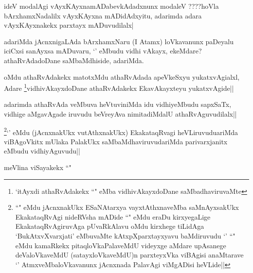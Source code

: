 \begin{artha}
ideV modalAgi vAyxKAyxnamADabevkAdadxnunx modaleV ????hoVla bArxhamxNadalilx vAyxKAyxna mADidAdxyitu, adarimda adara vAyxKAyxnakekx parxtayx mADuvudilalx|
\end{artha}


\begin{artha}
adariMda jAcnxnigaLAda bArxhamxNaru (I Atamx) loVkavanunx paDeyalu iciCxsi sanAyxsa mADuvaru, `\stext' eMbudu vidhi vAkayx, ekeMdare? athaRvAdadoDane saMbaMdhiside, adariMda.
\end{artha}


\begin{artha}
oMdu athaRvAdakekx matotxMdu athaRvAdada apeVkeSxyu yukatxvAgialxl, Adare \footnote{`\stext itAyxdi athaRvAdakekx ``\stext" eMba vidhivAkayxdoDane saMbadhaviruvaMte}vidhivAkayxdoDane athaRvAdakekx EkavAkayxteyu yukatxvAgide||
\end{artha}

\begin{artha}
adarimda athaRvAda veMbuva heVtuviniMda idu vidhiyeMbudu sapxSaTx, vidhige aMgavAgade iruvudu beVreyAva nimitadiMdalU athaRvAguvudilalx||
\end{artha}


\begin{artha}
\footnote{``\stext" eMdu jAcnxnakUkx ESaNAtarxya vayxtAthxnaveMba saMnAyxsakUkx EkakataqRvAgi nideRVsha mADide ``\stext" eMdu eraDu kirxyegaLige EkakataqRvAgiruvAga pUvaRkAlavu oMdu kirxhege tiLidAga `BukAtxvXvarxjati' eMbuvaMte kAtxpXparxtayxyavu baMdiruvudu `\stext' ``\stext" eMdu kamaRkekx pitaqloVkaPalaveMdU videyxge aMdare upAsanege deValoVkaveMdU (satayxloVkaveMdU)n parxteyxVka viBAgisi anaMtarave `\stext' AtmxveMbaloVkavanunx jAcnxnada PalavAgi viMgADisi heVLide||}`\stext' eMdu (jAcnxnakUkx vutAthxnakUkx) EkakataqRvagi heVLiruvuduariMda viBAgoVkitx mUlaka PalakUkx saMbaMdhaviruvudariMda parivarxjanitx eMbudu vidhiyAguvudu|| 
\end{artha}

\begin{artha}
meVlina viSayakekx ``\stext"
\end{artha}


